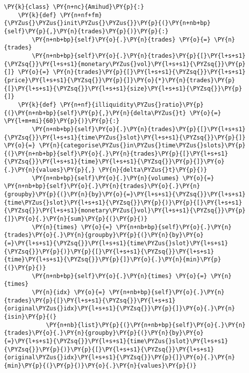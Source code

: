 \documentclass[11pt]{article}
\begin{document}
    \begin{tcolorbox}[breakable, size=fbox, boxrule=1pt, pad at break*=1mm,colback=cellbackground, colframe=cellborder]
\begin{Verbatim}[commandchars=\\\{\}]
\PY{k}{class} \PY{n+nc}{Amihud}\PY{p}{:}
    \PY{k}{def} \PY{n+nf+fm}{\PYZus{}\PYZus{}init\PYZus{}\PYZus{}}\PY{p}{(}\PY{n+nb+bp}{self}\PY{p}{,}\PY{n}{trades}\PY{p}{)}\PY{p}{:}
        \PY{n+nb+bp}{self}\PY{o}{.}\PY{n}{trades} \PY{o}{=} \PY{n}{trades}
        \PY{n+nb+bp}{self}\PY{o}{.}\PY{n}{trades}\PY{p}{[}\PY{l+s+s1}{\PYZsq{}}\PY{l+s+s1}{monetary\PYZus{}vol}\PY{l+s+s1}{\PYZsq{}}\PY{p}{]} \PY{o}{=} \PY{n}{trades}\PY{p}{[}\PY{l+s+s1}{\PYZsq{}}\PY{l+s+s1}{price}\PY{l+s+s1}{\PYZsq{}}\PY{p}{]}\PY{o}{*}\PY{n}{trades}\PY{p}{[}\PY{l+s+s1}{\PYZsq{}}\PY{l+s+s1}{size}\PY{l+s+s1}{\PYZsq{}}\PY{p}{]}
    \PY{k}{def} \PY{n+nf}{illiquidity\PYZus{}ratio}\PY{p}{(}\PY{n+nb+bp}{self}\PY{p}{,}\PY{n}{delta\PYZus{}t} \PY{o}{=} \PY{l+m+mi}{60}\PY{p}{)}\PY{p}{:}
        \PY{n+nb+bp}{self}\PY{o}{.}\PY{n}{trades}\PY{p}{[}\PY{l+s+s1}{\PYZsq{}}\PY{l+s+s1}{time\PYZus{}slot}\PY{l+s+s1}{\PYZsq{}}\PY{p}{]} \PY{o}{=} \PY{n}{categorise\PYZus{}in\PYZus{}time\PYZus{}slots}\PY{p}{(}\PY{n+nb+bp}{self}\PY{o}{.}\PY{n}{trades}\PY{p}{[}\PY{l+s+s1}{\PYZsq{}}\PY{l+s+s1}{time}\PY{l+s+s1}{\PYZsq{}}\PY{p}{]}\PY{o}{.}\PY{n}{values}\PY{p}{,} \PY{n}{delta\PYZus{}t}\PY{p}{)}
        \PY{n+nb+bp}{self}\PY{o}{.}\PY{n}{volumes} \PY{o}{=} \PY{n+nb+bp}{self}\PY{o}{.}\PY{n}{trades}\PY{o}{.}\PY{n}{groupby}\PY{p}{(}\PY{n}{by}\PY{o}{=}\PY{l+s+s1}{\PYZsq{}}\PY{l+s+s1}{time\PYZus{}slot}\PY{l+s+s1}{\PYZsq{}}\PY{p}{)}\PY{p}{[}\PY{l+s+s1}{\PYZsq{}}\PY{l+s+s1}{monetary\PYZus{}vol}\PY{l+s+s1}{\PYZsq{}}\PY{p}{]}\PY{o}{.}\PY{n}{sum}\PY{p}{(}\PY{p}{)}
        \PY{n}{times} \PY{o}{=} \PY{n+nb+bp}{self}\PY{o}{.}\PY{n}{trades}\PY{o}{.}\PY{n}{groupby}\PY{p}{(}\PY{n}{by}\PY{o}{=}\PY{l+s+s1}{\PYZsq{}}\PY{l+s+s1}{time\PYZus{}slot}\PY{l+s+s1}{\PYZsq{}}\PY{p}{)}\PY{p}{[}\PY{l+s+s1}{\PYZsq{}}\PY{l+s+s1}{time}\PY{l+s+s1}{\PYZsq{}}\PY{p}{]}\PY{o}{.}\PY{n}{min}\PY{p}{(}\PY{p}{)}
        \PY{n+nb+bp}{self}\PY{o}{.}\PY{n}{times} \PY{o}{=} \PY{n}{times}
        \PY{n}{idx} \PY{o}{=} \PY{n+nb+bp}{self}\PY{o}{.}\PY{n}{trades}\PY{p}{[}\PY{l+s+s1}{\PYZsq{}}\PY{l+s+s1}{original\PYZus{}idx}\PY{l+s+s1}{\PYZsq{}}\PY{p}{]}\PY{o}{.}\PY{n}{isin}\PY{p}{(}
            \PY{n+nb}{list}\PY{p}{(}\PY{n+nb+bp}{self}\PY{o}{.}\PY{n}{trades}\PY{o}{.}\PY{n}{groupby}\PY{p}{(}\PY{n}{by}\PY{o}{=}\PY{l+s+s1}{\PYZsq{}}\PY{l+s+s1}{time\PYZus{}slot}\PY{l+s+s1}{\PYZsq{}}\PY{p}{)}\PY{p}{[}\PY{l+s+s1}{\PYZsq{}}\PY{l+s+s1}{original\PYZus{}idx}\PY{l+s+s1}{\PYZsq{}}\PY{p}{]}\PY{o}{.}\PY{n}{min}\PY{p}{(}\PY{p}{)}\PY{o}{.}\PY{n}{values}\PY{p}{)}

\end{Verbatim}
\end{tcolorbox}
\end{document}
